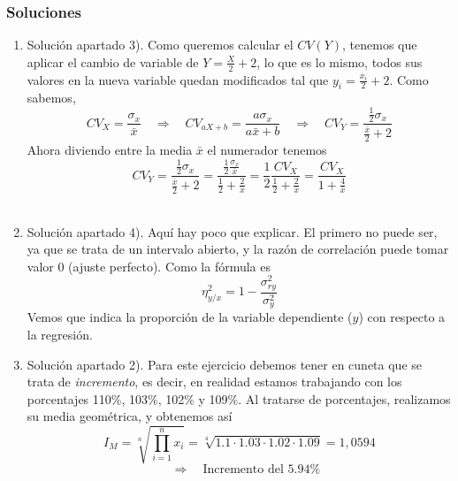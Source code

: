 \documentclass[fleqn]{article}
\def\next{\quad \Rightarrow \quad}
\begin{document}
\begin{enumerate}
                \newpage

                \subsubsection{Soluciones}

                        \begin{enumerate}
                                \item Solución apartado 3). Como queremos calcular el $CV(Y)$, tenemos que aplicar el cambio de variable 
                                        de $Y = \frac{X}{2} + 2$, lo que es lo mismo, todos sus valores en la nueva variable quedan modificados tal que 
                                        $y_i = \frac{x_i}{2} + 2$. Como sabemos, 
                                        $$CV_X = \frac{\sigma_x}{\bar{x}} \next CV_{aX+b} = \frac{a\sigma_x}{a\bar{x} + b} \next CV_Y = \frac{\frac{1}{2}\sigma_x}{\frac{\bar{x}}{2} + 2}$$
                                        Ahora diviendo entre la media $\bar{x}$ el numerador tenemos
                                        $$CV_Y = \frac{\frac{1}{2}\sigma_x}{\frac{\bar{x}}{2} + 2} = \frac{\frac{1}{2}\frac{\sigma_x}{\bar{x}}}{\frac{1}{2} + \frac{2}{\bar{x}}} = 
                                        \frac{1}{2}\frac{CV_X}{\frac{1}{2} + \frac{2}{\bar{x}}} = \frac{CV_X}{1 + \frac{4}{\bar{x}}}$$ \\

                                \item Solución apartado 4). Aquí hay poco que explicar. El primero no puede ser, ya que se trata de un
                                        intervalo abierto, y la razón de correlación puede tomar valor 0 (ajuste perfecto). Como la fórmula es
                                        $$\eta^2_{y/x} = 1 - \frac{\sigma_{ry}^2}{\sigma_y^2}$$
                                        Vemos que indica la proporción de la variable dependiente ($y$) con respecto a la regresión.\\

                                \item Solución apartado 2). Para este ejercicio debemos tener en cuneta que se trata de \textit{incremento}, es decir,
                                        en realidad estamos trabajando con los porcentajes 110\%, 103\%, 102\% y 109\%. Al tratarse de porcentajes, realizamos su media 
                                        geométrica, y obtenemos así 
                                        $$I_M = \sqrt[n]{\prod_{i=1}^n x_i} = \sqrt[4]{1.1 \cdot 1.03 \cdot 1.02 \cdot 1.09} = 1,0594 $$
                                        $$\next \text{Incremento del }5.94\%$$\\


\end{enumerate}
\end{enumerate}
\end{document}
